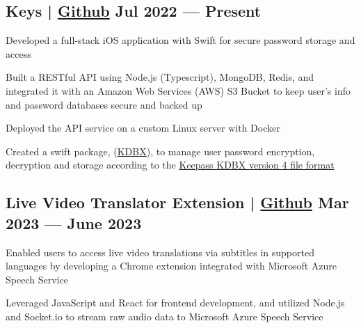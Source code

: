 \subsection{{Keys | \href{https://github.com/jerikjakobsen/keys}{Github} \hfill Jul 2022 --- Present}}
\begin{zitemize}
\item Developed a full-stack iOS application with Swift for secure password storage and access
\item Built a RESTful API using Node.js (Typescript), MongoDB, Redis, and integrated it with an Amazon Web Services (AWS) S3 Bucket to keep user's info and password databases secure and backed up
\item Deployed the API service on a custom Linux server with Docker
\item Created a swift package, (\href{https://github.com/jerikjakobsen/kdbx}{KDBX}), to manage user password encryption, decryption and storage according to the  \href{https://keepass.info/help/kb/kdbx_4.html}{Keepass KDBX version 4 file format}
\end{zitemize}


\subsection{{Live Video Translator Extension | \href{https://github.com/jerikjakobsen/Translator-Extension}{Github} \hfill Mar 2023 --- June 2023}}
\begin{zitemize}
\item Enabled users to access live video translations via subtitles in supported languages by developing a Chrome extension integrated with Microsoft Azure Speech Service
\item Leveraged JavaScript and React for frontend development, and utilized Node.js and Socket.io to stream raw audio data to Microsoft Azure Speech Service
\end{zitemize}
